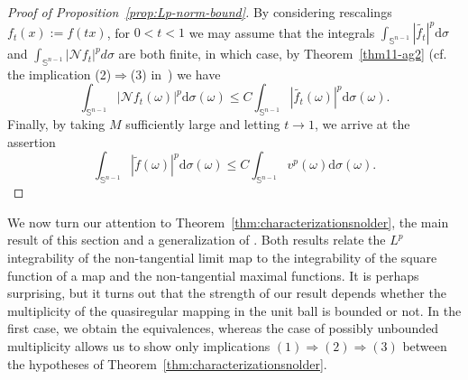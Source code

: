 \documentclass[11pt,a4paper,reqno]{amsart}
\theoremstyle{definition}
\newcommand{\om}{\omega}
\newcommand{\Nm}{\mathcal{N}}
\newcommand{\ud}{\mathrm {d}}
\newcommand{\Sn}{\mathbb{S}^{n-1}}
\newcommand{\blue}{\color{blau}}
\newcommand{\red}{\color{red}}
\newcounter{komcounter}
\numberwithin{komcounter}{section}
\newcommand{\komT}[1]{{\bf \blue [\refstepcounter{komcounter}\thekomcounter (by T): #1]}}
\newcommand{\komI}[1]{{\bf \red [\refstepcounter{komcounter}\thekomcounter (by I): #1]}}
\begin{document}
\begin{proof}[Proof of Proposition~\ref{prop:Lp-norm-bound}]
By considering rescalings $f_t(x):=f(tx)$, for $0<t<1$ we may assume that the integrals $\int_{\Sn} |\tilde{f_t}|^p \ud\sigma$ and $\int_{\Sn}|\Nm f_t|^pd\sigma$ are both finite, in which case, by Theorem~\ref{thm11-ag2} (cf. the implication (2)$\Rightarrow$(3) in~\cite[Theorem 1.1]{ag2}) we have
$$
\int_{\Sn}|\Nm f_t(\om)|^p \ud\sigma(\om) \leq C\int_{\Sn}|\tilde{f_t}(\om)|^p \ud\sigma(\om).
$$
Finally, by taking $M$ sufficiently large and letting $t\to 1$, we arrive at the assertion
$$
\int_{\Sn}|\tilde{f}(\om)|^p\ud\sigma(\om) \leq C\int_{\Sn} v^p(\om) \ud\sigma(\om).
$$
\end{proof}

We now turn our attention to Theorem~\ref{thm:characterizationsnolder}, the main result of this section and a generalization of \cite[Theorem 5.1]{ak}. Both results relate the $L^p$ integrability of the non-tangential limit map to the integrability of the square function of a map and the non-tangential maximal functions. It is perhaps surprising, but it turns out that the strength of our result depends whether the multiplicity of the quasiregular mapping in the unit ball is bounded or not. In the first case, we obtain the equivalences, whereas the case of possibly unbounded multiplicity allows us to show only implications $(1) \Rightarrow (2) \Rightarrow(3)$ between the hypotheses of Theorem~\ref{thm:characterizationsnolder}.
\end{document}

